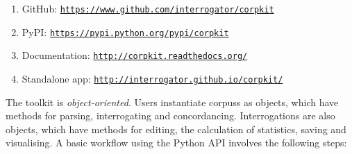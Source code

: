 \begin{enumerate}
    \item GitHub: \texttt{\href{https://www.github.com/interrogator/corpkit}{https://www.github.com/interrogator/corpkit}}
    \item PyPI: \texttt{\href{https://pypi.python.org/pypi/corpkit}{https://pypi.python.org/pypi/corpkit}}
    \item Documentation: \texttt{\href{http://corpkit.readthedocs.org/}{http://corpkit.readthedocs.org/}}
    \item Standalone app: \texttt{\href{http://interrogator.github.io/corpkit/}{http://interrogator.github.io/corpkit/}}
\end{enumerate} 
%

The toolkit is \emph{object\hyp{}oriented}. Users instantiate \glspl{corpus} as objects, which have methods for parsing, interrogating and concordancing. Interrogations are also objects, which have methods for editing, the calculation of statistics, saving and visualising. A basic workflow using the Python \gls{API} involves the following steps:


